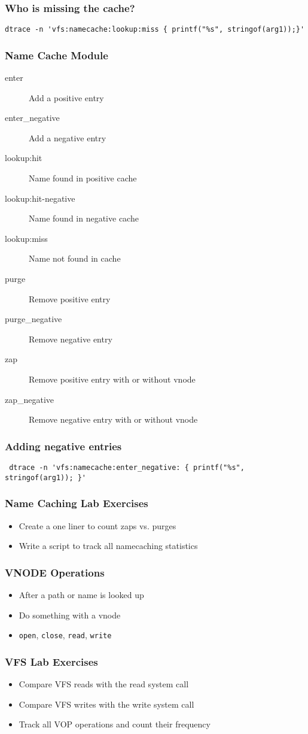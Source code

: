 \documentclass[pdftex]{beamer}
\begin{document}
\begin{frame}[fragile]
  \frametitle{Who is missing the cache?}
\begin{verbatim}
dtrace -n 'vfs:namecache:lookup:miss { printf("%s", stringof(arg1));}'
\end{verbatim}
\end{frame}

\begin{frame}[fragile]
  \frametitle{Name Cache Module}
  \begin{description}
  \item[enter] Add a positive entry
  \item[enter\_negative] Add a negative entry
  \item[lookup:hit] Name found in positive cache
  \item[lookup:hit-negative] Name found in negative cache
  \item[lookup:miss] Name not found in cache
  \item[purge] Remove positive entry
  \item[purge\_negative] Remove negative entry
  \item[zap] Remove positive entry with or without vnode
  \item[zap\_negative] Remove negative entry with or without vnode
  \end{description}
\end{frame}

\begin{frame}[fragile]
  \frametitle{Adding negative entries}
\begin{verbatim}
 dtrace -n 'vfs:namecache:enter_negative: { printf("%s", stringof(arg1)); }'
\end{verbatim}
\end{frame}

\begin{frame}
  \frametitle{Name Caching Lab Exercises}
  \begin{itemize}
  \item Create a one liner to count zaps vs. purges
  \item Write a script to track all namecaching statistics
  \end{itemize}
\end{frame}

\begin{frame}[fragile]
  \frametitle{VNODE Operations}
  \begin{itemize}
  \item After a path or name is looked up
  \item Do something with a vnode
  \item \verb|open|, \verb|close|, \verb|read|, \verb|write|
  \end{itemize}
\end{frame}

\begin{frame}
  \frametitle{VFS Lab Exercises}
  \begin{itemize}
  \item Compare VFS reads with the read system call
  \item Compare VFS writes with the write system call
  \item Track all VOP operations and count their frequency
  \end{itemize}
\end{frame}
\end{document}
